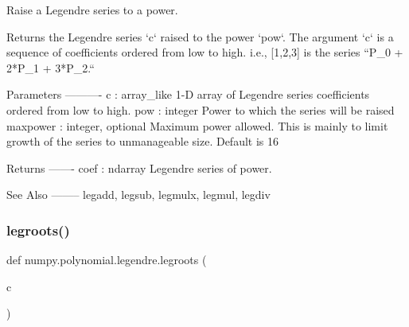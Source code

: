 \begin{DoxyVerb}Raise a Legendre series to a power.

Returns the Legendre series `c` raised to the power `pow`. The
argument `c` is a sequence of coefficients ordered from low to high.
i.e., [1,2,3] is the series  ``P_0 + 2*P_1 + 3*P_2.``

Parameters
----------
c : array_like
    1-D array of Legendre series coefficients ordered from low to
    high.
pow : integer
    Power to which the series will be raised
maxpower : integer, optional
    Maximum power allowed. This is mainly to limit growth of the series
    to unmanageable size. Default is 16

Returns
-------
coef : ndarray
    Legendre series of power.

See Also
--------
legadd, legsub, legmulx, legmul, legdiv\end{DoxyVerb}
 \mbox{\label{namespacenumpy_1_1polynomial_1_1legendre_a4e926e5c4890a7dc4f2d54be8b13f56d}} 
\subsubsection{\texorpdfstring{legroots()}{legroots()}}
{\footnotesize\ttfamily def numpy.\+polynomial.\+legendre.\+legroots (\begin{DoxyParamCaption}\item[{}]{c }\end{DoxyParamCaption})}

